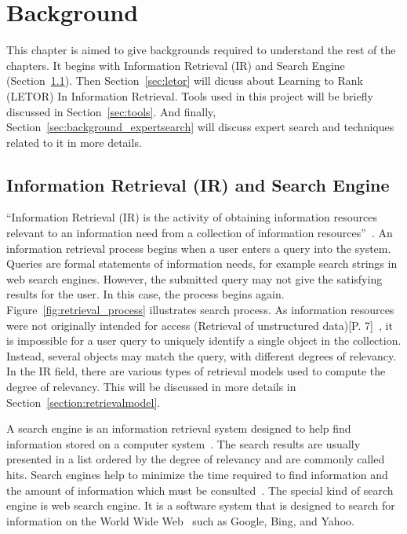 
\chapter{Background}\label{section:background}
This chapter is aimed to give backgrounds required to understand the rest of the chapters. It begins with Information Retrieval (IR) and Search Engine (Section~\ref{section:IR}).
Then Section~\ref{sec:letor} will dicuss about Learning to Rank (LETOR) In Information Retrieval. Tools used in this project will be briefly discussed in
Section~\ref{sec:tools}. And finally, Section~\ref{sec:background_expertsearch} will discuss expert search and techniques related to it in more 
details.

\section{Information Retrieval (IR) and Search Engine}\label{section:IR}
``Information Retrieval (IR) is the activity of obtaining information resources relevant to an information need from a collection of information resources''~\cite{IR}. 
An information retrieval process begins when a user 
enters a query into the system. Queries are formal statements of information needs, for example search strings in web search engines. However, the 
submitted query may not give the satisfying results for the user. In this case, the process begins again. Figure~\ref{fig:retrieval_process} illustrates
search process. As information resources were not originally intended for access (Retrieval of unstructured data)[P. 7]~\cite{IRlecture}, 
it is impossible for a user query to uniquely identify a single object in the collection. Instead, several objects may match the query, 
with different degrees of relevancy. In the IR field, there are various types of retrieval models used to compute the degree of relevancy. This will
be discussed in more details in Section~\ref{section:retrievalmodel}.

A search engine is an information retrieval system designed to help find information stored on a computer system~\cite{searchengine}. The search results are usually 
presented in a list ordered by the degree of relevancy and are commonly called hits. 
Search engines help to minimize the time required to find information and the amount of 
information which must be consulted~\cite{searchengine}. The special kind of search engine is 
web search engine. It is a software system that is designed to search for information on the World Wide Web~\cite{websearchengine} such as Google, 
Bing, and Yahoo.

